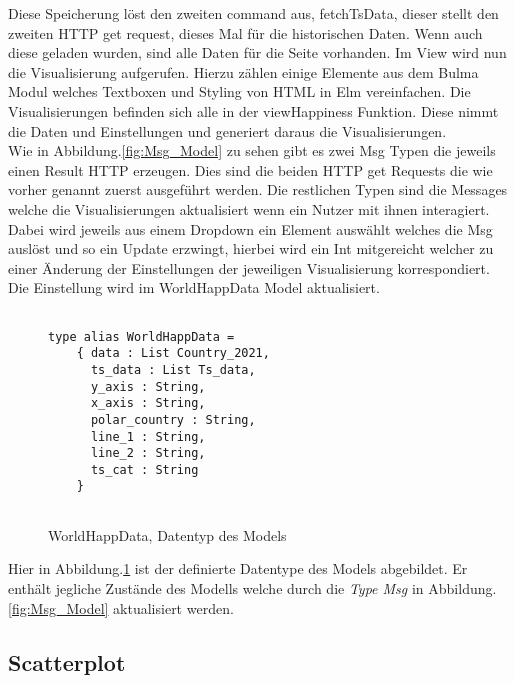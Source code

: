 Diese Speicherung löst den zweiten command aus, fetchTsData, dieser stellt den zweiten HTTP get request, dieses Mal für die historischen Daten. Wenn auch diese geladen wurden, sind alle Daten für die Seite vorhanden. Im View wird nun die Visualisierung aufgerufen. Hierzu zählen einige Elemente aus dem Bulma Modul welches Textboxen und Styling von HTML in Elm vereinfachen. Die Visualisierungen befinden sich alle in der viewHappiness Funktion. Diese nimmt die Daten und Einstellungen und generiert daraus die Visualisierungen. \cite{elm-bulma} \\


Wie in  Abbildung.\ref{fig:Msg_Model} zu sehen gibt es zwei Msg Typen die jeweils einen Result HTTP erzeugen. Dies sind die beiden HTTP get Requests die wie vorher genannt zuerst ausgeführt werden. Die restlichen Typen sind die Messages welche die Visualisierungen aktualisiert wenn ein Nutzer mit ihnen interagiert. Dabei wird jeweils aus einem Dropdown ein Element auswählt welches die Msg auslöst und so ein Update erzwingt, hierbei wird ein Int mitgereicht welcher zu einer Änderung der Einstellungen der jeweiligen Visualisierung korrespondiert. Die Einstellung wird im WorldHappData Model aktualisiert. \\

\begin{figure}[ht]
\centering
\begin{mdframed}[backgroundcolor=backcolour]
\begin{verbatim}

type alias WorldHappData = 
    { data : List Country_2021,
      ts_data : List Ts_data,
      y_axis : String,
      x_axis : String,
      polar_country : String,
      line_1 : String,
      line_2 : String,
      ts_cat : String
    }
  
\end{verbatim}
\end{mdframed}
    \caption{WorldHappData, Datentyp des Models}
    \label{fig:Worldhapp}
\end{figure}

Hier in Abbildung.\ref{fig:Worldhapp} ist der definierte Datentype des Models abgebildet. Er enthält jegliche Zustände des Modells welche durch die \textit{Type Msg} in Abbildung.\ref{fig:Msg_Model} aktualisiert werden. \\

\newpage
\subsection{Scatterplot}

